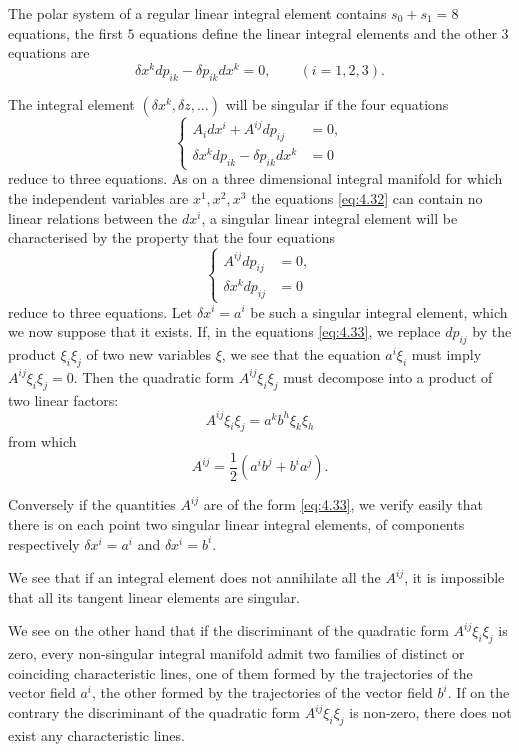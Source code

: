 The polar system of a regular linear integral element contains $s_{0}+s_{1}=8$ equations, the first $5$ equations define the linear integral elements and the other $3$ equations are
\[
\delta x^{k}dp_{ik}-\delta p_{ik}dx^{k}=0,\qquad (i=1,2,3).
\]

The integral element $(\delta x^{k},\delta z,\dots)$ will be singular if the four equations
\begin{equation}
  \label{eq:4.32}
\left\{\begin{aligned}
  A_{i}dx^{i}+A^{ij}dp_{ij}&=0,\\
  \delta x^{k}dp_{ik}-\delta p_{ik}dx^{k}&=0
\end{aligned}\right.
\end{equation}
reduce to three equations. As on a three dimensional integral manifold for which the independent variables are $x^{1},x^{2},x^{3}$ the equations \eqref{eq:4.32} can contain no linear relations between the $dx^{i}$, a singular linear integral element will be characterised by the property that the four equations
\begin{equation}
  \label{eq:4.33}
  \left\{
    \begin{aligned}
      A^{ij}dp_{ij}&=0,\\
      \delta x^{k}dp_{ij}&=0
    \end{aligned}
\right.
\end{equation}
reduce to three equations. Let $\delta x^{i}=a^{i}$ be such a singular integral element, which we now suppose that it exists. If, in the equations \eqref{eq:4.33}, we replace $dp_{ij}$ by the product $\xi_{i}\xi_{j}$ of two new variables $\xi$, we see that the equation $a^{i}\xi_{i}$ must imply $A^{ij}\xi_{i}\xi_{j}=0$. Then the quadratic form $A^{ij}\xi_{i}\xi_{j}$ must decompose into a product of two linear factors:
\[
A^{ij}\xi_{i}\xi_{j}=a^{k}b^{h}\xi_{k}\xi_{h}
\]
from which
\begin{equation}
  \label{eq:4.34}
  A^{ij}=\frac{1}{2}(a^{i}b^{j}+b^{i}a^{j}).
\end{equation}

Conversely if the quantities $A^{ij}$ are of the form \eqref{eq:4.33}, we verify easily that there is on each point two singular linear integral elements, of components respectively $\delta x^{i}=a^{i}$ and $\delta x^{i}=b^{i}$.

We see that if an integral element does not annihilate all the $A^{ij}$, it is impossible that all its tangent linear elements are singular.

We see on the other hand that if the discriminant of the quadratic form $A^{ij}\xi_{i}\xi_{j}$ is zero, every non-singular integral manifold admit two families of distinct or coinciding characteristic lines, one of them formed by the trajectories of the vector field $a^{i}$, the other formed  by the trajectories of the vector field $b^{i}$. If on the contrary the discriminant of the quadratic form $A^{ij}\xi_{i}\xi_{j}$ is non-zero, there does not exist any characteristic lines.

